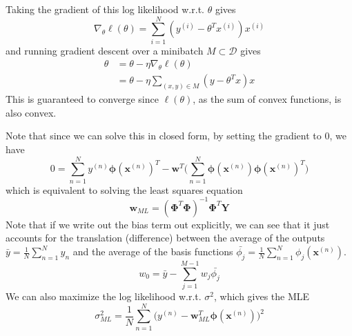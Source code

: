 \documentclass{article}
\begin{document}
    \begin{theorem}
      Taking the gradient of this log likelihood w.r.t. $\theta$ gives 
      \[\nabla_\theta \ell (\theta) = \sum_{i=1}^N ( y^{(i)} - \theta^T x^{(i)}) x^{(i)} \]
      and running gradient descent over a minibatch $M \subset \mathcal{D}$ gives 
      \begin{align*}
          \theta & = \theta - \eta \nabla_\theta \ell (\theta) \\
          & = \theta - \eta \sum_{(x, y) \in M} (y - \theta^T x) x
      \end{align*}
      This is guaranteed to converge since $\ell(\theta)$, as the sum of convex functions, is also convex. 

      Note that since we can solve this in closed form, by setting the gradient to $0$, we have 
      \[0 = \sum_{n=1}^N y^{(n)} \boldsymbol{\phi}(\mathbf{x}^{(n)})^T - \mathbf{w}^T \bigg( \sum_{n=1}^N \boldsymbol{\phi}(\mathbf{x}^{(n)}) \boldsymbol{\phi}(\mathbf{x}^{(n)})^T \bigg)\]
      which is equivalent to solving the least squares equation 
      \[\mathbf{w}_{ML} = ( \boldsymbol{\Phi}^T \boldsymbol{\Phi})^{-1} \boldsymbol{\Phi}^T \mathbf{Y}\]
      Note that if we write out the bias term out explicitly, we can see that it just accounts for the translation (difference) between the average of the outputs $\bar{y} = \frac{1}{N} \sum_{n=1}^N y_n$ and the average of the basis functions $\bar{\phi_j} = \frac{1}{N} \sum_{n=1}^N \phi_j (\mathbf{x}^{(n)})$. 
      \[w_0 = \bar{y} - \sum_{j=1}^{M-1} w_j \bar{\phi_j}\]
      We can also maximize the log likelihood w.r.t. $\sigma^2$, which gives the MLE 
      \[\sigma^2_{ML} = \frac{1}{N} \sum_{n=1}^N \big( y^{(n)} - \mathbf{w}^T_{ML} \boldsymbol{\phi}(\mathbf{x}^{(n)}) \big)^2\]
    \end{theorem}
\end{document}
